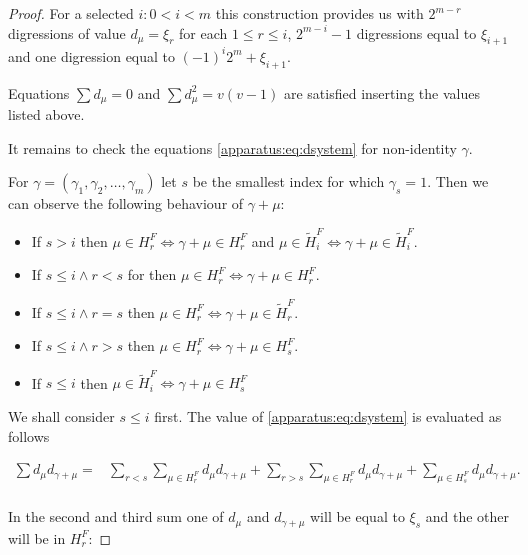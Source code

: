 \begin{proof}
	For a selected $i \colon 0 < i < m$ this construction provides us with $2^{m-r}$ digressions of value $d_\mu=\xi_r$ for each $1 \leq r\leq i$, $2^{m-i}-1$ digressions equal to $\xi_{i+1}$ and one digression equal to $(-1)^i 2^m+\xi_{i+1}$.
    
    Equations $\sum d_\mu = 0$ and $\sum d_\mu^2 = v(v-1)$ are satisfied inserting the values listed above.
    
    It remains to check the equations \eqref{apparatus:eq:dsystem} for non-identity $\gamma$.
    
    For $\gamma = (\gamma_1, \gamma_2, \ldots, \gamma_m)$ let $s$ be the smallest index for which $\gamma_s=1$. Then we can observe the following behaviour of $\gamma + \mu$:
    \begin{itemize}
        \item If $s > i$ then $\mu \in H_r^F \iff  \gamma + \mu \in H_r^F$ and $\mu \in \widetilde H_i^F \iff  \gamma + \mu \in \widetilde H_i^F$.
        \item If $s \leq i \land r < s$ for then $\mu \in H_r^F \iff  \gamma + \mu \in H_r^F$.
        \item If $s \leq i \land r = s$ then $\mu \in H_r^F \iff  \gamma + \mu \in \widetilde H_r^F$.
        \item If $s \leq i \land r > s$ then $\mu \in H_r^F \iff  \gamma + \mu \in H_s^F$.
        \item If $s \leq i$ then $\mu \in \widetilde H_i^F \iff \gamma + \mu \in H_s^F$
    \end{itemize}
    
    We shall consider $s\leq i$ first. The value of \eqref{apparatus:eq:dsystem} is evaluated as follows
    
    \begin{equation}
        \begin{split}
            \sum d_\mu d_{\gamma+\mu}
              = & \sum\limits_{r<s} \sum\limits_{\mu \in H_r^F} d_\mu d_{\gamma + \mu}
                + \sum\limits_{r>s} \sum\limits_{\mu \in H_r^F} d_\mu d_{\gamma + \mu}
                + \sum\limits_{\mu \in H_s^F} d_\mu d_{\gamma + \mu}. \\
        \end{split}
    \end{equation}
    
    In the second and third sum one of $d_\mu$ and $d_{\gamma + \mu}$ will be equal to $\xi_s$ and the other will be in $H_r^F$:
    

\end{proof}
